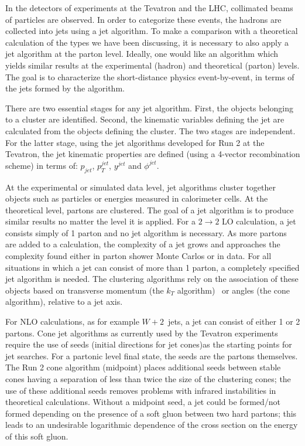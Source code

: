 \documentclass[12pt]{iopart}
\begin{document}
In the detectors of experiments at the Tevatron and the LHC, collimated beams of particles are observed. In order
to categorize these events, the hadrons are collected into jets using a jet algorithm. To make a comparison with a
theoretical calculation of the types we have been discussing, it is necessary to also apply a jet algorithm at the
parton level. Ideally, one would like an algorithm which yields similar results at the experimental (hadron) and
theoretical (parton) levels. The goal is to characterize the short-distance physics event-by-event, in terms of the
jets formed by the algorithm. 

There are two essential stages for any jet algorithm. First, the objects belonging to a  cluster are identified. 
Second, the kinematic variables defining the jet are calculated  from the objects defining the cluster. The two
stages are independent.  For the latter  stage, using the jet algorithms developed for Run 2 at the Tevatron, the
jet kinematic properties are defined (using a 4-vector  recombination scheme) in terms of: $p_{jet}$, $p_T^{jet}$,
$y^{jet}$ and $\phi^{jet}$. 


At the experimental or simulated data level, jet algorithms cluster together objects  such as particles or energies
measured in calorimeter cells. At the theoretical level,   partons  are clustered. The goal of a jet algorithm is
to produce similar results no matter  the level it is applied. For a $2\rightarrow2$ LO calculation, a jet consists
simply of 1  parton and no jet algorithm is necessary. As more partons are added to a calculation, the  complexity
of a jet grows and approaches the complexity found either in parton shower  Monte Carlos or in data. For all
situations in which a jet can consist of more than 1 parton,   a completely specified jet algorithm is needed. The
clustering algorithms rely on the  association of these objects based on transverse momentum
(the $k_T$ algorithm)~\cite{Blazey:2000qt} or angles (the cone algorithm), relative to a jet axis. 

For NLO calculations, as for example $W + 2$~jets, a jet can consist of either 1 or 2  partons. Cone jet 
algorithms as currently used by the Tevatron experiments require the use of seeds (initial directions for  jet
cones)as the  starting points for jet searches.  For a partonic level final state, the seeds are the partons 
themselves. The Run 2 cone algorithm (midpoint)  places additional seeds  between stable cones having a separation
of less than twice the size of the  clustering cones; the use of these additional seeds removes problems with
infrared instabilities  in theoretical calculations. Without a midpoint seed, a jet could be formed/not formed 
depending on the presence of a soft gluon between two hard partons; this leads to an  undesirable logarithmic
dependence of the cross section on the energy of this soft gluon. 
\end{document}
